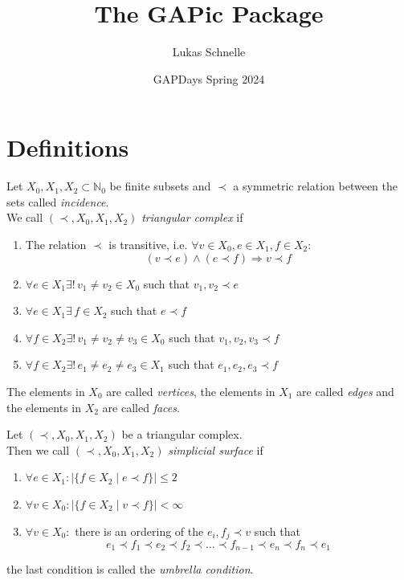 \documentclass{beamer}
\title{The GAPic Package}
\subtitle{}
\author{Lukas Schnelle}
\date{GAPDays Spring 2024}
\numberwithin{equation}{aufgabe}
\newcommand\N{\mathbb N}
\begin{document}
\frame[plain]{\titlepage}

\section{Definitions}
\begin{frame}
    \begin{definition}\label{def:triangular-comp}
    	Let $X_0, X_1, X_2 \subset \N_0$ be finite subsets and $\prec$ a symmetric relation between the sets called \emph{incidence}. \pause \\
    	We call $(\prec, X_0, X_1, X_2)$ \emph{triangular complex} if
    	\begin{enumerate}[label=(\roman*)] \pause 
    		\item The relation $\prec$ is transitive, i.e. $\forall v \in X_0, e \in X_1, f \in X_2$:
    		$$(v \prec e) \wedge (e \prec f) \Rightarrow v \prec f$$
    		\item \pause $\forall e \in X_1 \exists !\,  v_1 \neq v_2 \in X_0$ such that $v_1, v_2 \prec e$\pause 
    		\item $\forall e \in X_1 \exists \, f \in X_2$ such that $e \prec f$ \pause 
    		\item $\forall f \in X_2 \exists ! \, v_1 \neq v_2 \neq v_3 \in X_0$ such that $v_1, v_2, v_3 \prec f$ \pause 
            \item $\forall f \in X_2 \exists ! \, e_1 \neq e_2 \neq e_3 \in X_1$ such that $e_1, e_2, e_3 \prec f$ \pause 
    	\end{enumerate}
    	The elements in $X_0$ are called \emph{vertices}, the elements in $X_1$ are called \emph{edges} and the elements in $X_2$ are called \emph{faces}.
    \end{definition}
\end{frame}

\begin{frame}
    \begin{definition}
        Let $(\prec, X_0, X_1, X_2)$ be a triangular complex.\\
        Then we call $(\prec, X_0, X_1, X_2)$ \emph{simplicial surface} if \pause
        \begin{enumerate}[label=(\roman*)]
            \item $\forall e \in X_1 : | \{ f \in X_2 \mid e \prec f \} | \leq 2 $ \pause
            \item $\forall v \in X_0 : | \{ f \in X_2 \mid v \prec f \} | < \infty$ \pause
            \item $\forall v \in X_0: $ there is an ordering of the $e_i, f_j \prec v$ such that 
            $$
                e_1 \prec f_1 \prec e_2 \prec f_2 \prec \dots \prec f_{n-1} \prec e_{n} \prec f_{n} \prec e_1
            $$ \pause
        \end{enumerate}
        the last condition is called the \emph{umbrella condition}.
    \end{definition}
\end{frame}
\end{document}
